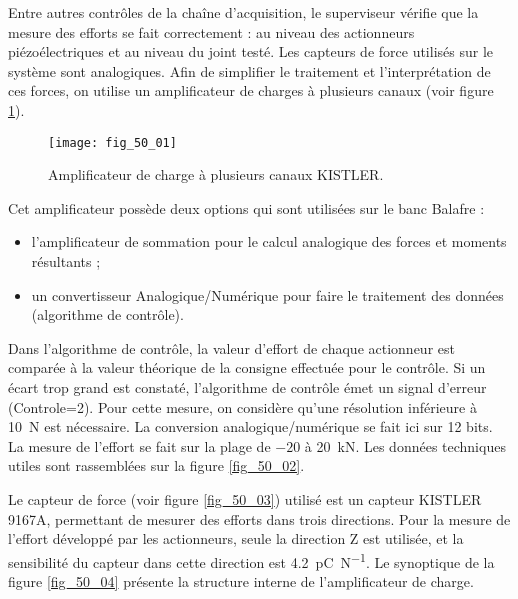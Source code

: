 \normaltrue \difficilefalse \tdifficilefalse
\correctionfalse

\setcounter{question}{0}
\ifcorrection
\else
{}
\fi

\ifprof
\else


Entre autres contrôles de la chaîne d’acquisition, le superviseur vérifie que la mesure des
efforts se fait correctement : au niveau des actionneurs piézoélectriques et au niveau du
joint testé. Les capteurs de force utilisés sur le système sont analogiques. Afin de simplifier
le traitement et l’interprétation de ces forces, on utilise un amplificateur de charges à
plusieurs canaux (voir figure \ref{fig_50_01}).





\begin{figure}[H]
\centering
\texttt{[image: fig\_50\_01]}
\caption{Amplificateur de charge à plusieurs canaux KISTLER. \label{fig_50_01}}
\end{figure}



Cet amplificateur possède deux options qui sont utilisées sur le banc Balafre :
\begin{itemize}
\item l’amplificateur de sommation pour le calcul analogique des forces et moments résultants
;
\item un convertisseur Analogique/Numérique pour faire le traitement des données (algorithme
de contrôle).
\end{itemize}
Dans l’algorithme de contrôle, la valeur d’effort de chaque actionneur est comparée à
la valeur théorique de la consigne effectuée pour le contrôle. Si un écart trop grand est
constaté, l’algorithme de contrôle émet un signal d’erreur (Controle=2). Pour cette mesure,
on considère qu’une résolution inférieure à  \SI{10}{N} est nécessaire.
La conversion analogique/numérique se fait ici sur 12 bits. La mesure de l’effort se fait
sur la plage de $-20$ à \SI{20}{kN}. Les données techniques utiles sont rassemblées sur la figure
\ref{fig_50_02}.

Le capteur de force (voir figure \ref{fig_50_03}) utilisé est un capteur KISTLER 9167A, permettant
de mesurer des efforts dans trois directions. Pour la mesure de l’effort développé par
les actionneurs, seule la direction Z est utilisée, et la sensibilité du capteur dans cette
direction est \SI{4,2}{pC.N^{-1}}.
Le synoptique de la figure \ref{fig_50_04} présente la structure interne de l’amplificateur de charge.

